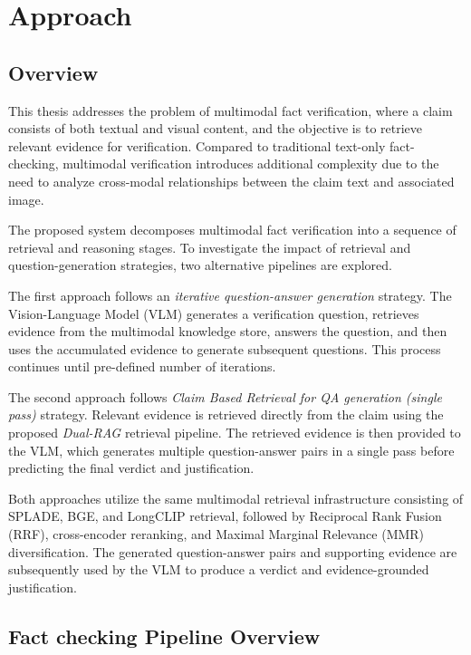 \chapter{Approach}
\label{ch:approach}

\section{Overview}

\noindent
    
    This thesis addresses the problem of multimodal fact verification, where a claim consists of both textual and visual content, and the objective is to retrieve relevant evidence for verification. Compared to traditional text-only fact-checking, multimodal verification introduces additional complexity due to the need to analyze cross-modal relationships between the claim text and associated image.


The proposed system decomposes multimodal fact verification into a sequence of retrieval and reasoning stages. To investigate the impact of retrieval and question-generation strategies, two alternative pipelines are explored.

The first approach follows an \textit{iterative question-answer generation} strategy. The Vision-Language Model (VLM) generates a verification question, retrieves evidence from the multimodal knowledge store, answers the question, and then uses the accumulated evidence to generate subsequent questions. This process continues until pre-defined number of iterations.

The second approach follows \textit{Claim Based Retrieval for QA generation (single pass)} strategy. Relevant evidence is retrieved directly from the claim using the proposed \textit{Dual-RAG} retrieval pipeline. The retrieved evidence is then provided to the VLM, which generates multiple question-answer pairs in a single pass before predicting the final verdict and justification.

Both approaches utilize the same multimodal retrieval infrastructure consisting of SPLADE, BGE, and LongCLIP retrieval, followed by Reciprocal Rank Fusion (RRF), cross-encoder reranking, and Maximal Marginal Relevance (MMR) diversification. The generated question-answer pairs and supporting evidence are subsequently used by the VLM to produce a verdict and evidence-grounded justification.


\section{Fact checking Pipeline Overview}

